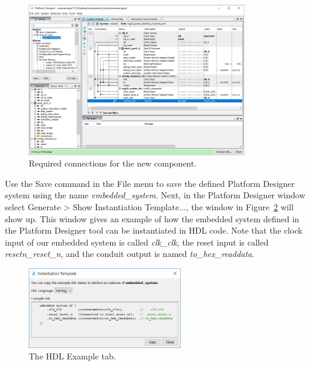 \documentclass[11pt, twoside, pdftex]{article}
\begin{document}
\begin{figure}[h]
   \begin{center}
        \includegraphics[width=0.85\textwidth]{figures/figure25.png}
   \end{center}
   \caption{Required connections for the new component.}
	\label{fig:25}
\end{figure}

Use the {\sf Save} command in the {\sf File} menu to save the defined Platform Designer system
using the name {\it embedded\_system}.
Next, in the Platform Designer window select {\sf Generate > Show Instantiation Template...}, the window in Figure~\ref{fig:26} will show up. 
This window gives an example of how the embedded system defined in the Platform Designer tool can 
be instantiated in HDL code. Note that the clock input of our embedded system is called 
{\it clk\_clk}, the reset input is called {\it resetn\_reset\_n}, and the conduit output is named
{\it to\_hex\_readdata}. 

\begin{figure}[H]
   \begin{center}
        \includegraphics[width=0.6\textwidth]{figures/figure26.png}
   \end{center}
   \caption{The HDL Example tab.}
	\label{fig:26}
\end{figure}
\end{document}
